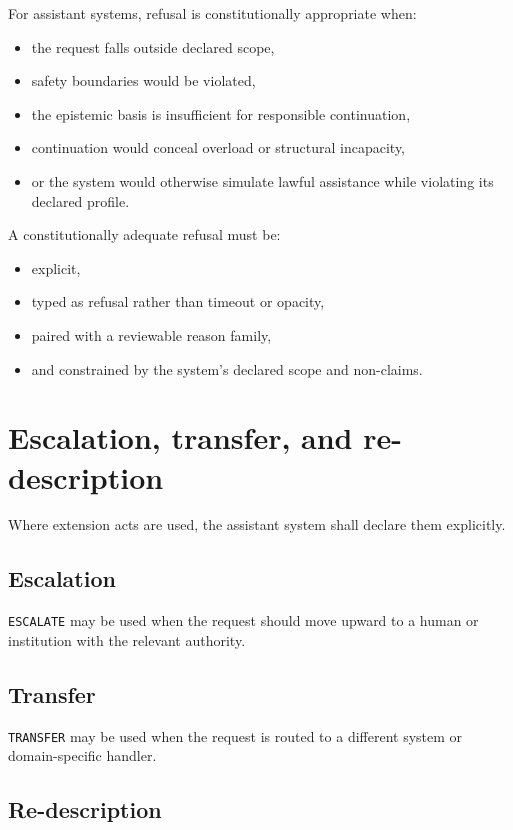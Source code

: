 \documentclass[11pt]{article}
\begin{document}
For assistant systems, refusal is constitutionally appropriate when:
\begin{itemize}[leftmargin=2em]
    \item the request falls outside declared scope,
    \item safety boundaries would be violated,
    \item the epistemic basis is insufficient for responsible continuation,
    \item continuation would conceal overload or structural incapacity,
    \item or the system would otherwise simulate lawful assistance while violating its declared profile.
\end{itemize}

A constitutionally adequate refusal must be:
\begin{itemize}[leftmargin=2em]
    \item explicit,
    \item typed as refusal rather than timeout or opacity,
    \item paired with a reviewable reason family,
    \item and constrained by the system's declared scope and non-claims.
\end{itemize}

\section{Escalation, transfer, and re-description}

Where extension acts are used, the assistant system shall declare them explicitly.

\subsection*{Escalation}

\texttt{ESCALATE} may be used when the request should move upward to a human or institution with the relevant authority.

\subsection*{Transfer}

\texttt{TRANSFER} may be used when the request is routed to a different system or domain-specific handler.

\subsection*{Re-description}
\end{document}
